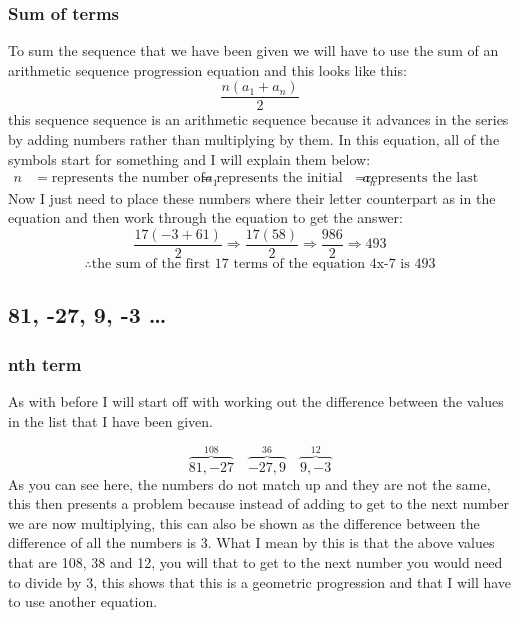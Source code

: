 \documentclass{article}
\begin{document}
\subsubsection{Sum of terms}
To sum the sequence that we have been given we will have to use the sum of an arithmetic sequence progression equation and this looks like this: 
\[
	\frac{n(a_{1} + a_{n})}{2}
\]
this sequence sequence is an arithmetic sequence because it advances in the series by adding numbers rather than multiplying by them. In this equation, all of the symbols start for something and I will explain them below:
\begin{align}

	n &= \mbox{represents the number of terms that you want to add, in this case it is 17}

	a_{1} &= \mbox{represents the initial number of the sequence, in this case it is -3}

	a_{n} &= \mbox{represents the last number of the sequence, in this case this is 61 as we calculated that before}

\end{align}
Now I just need to place these numbers where their letter counterpart as in the equation and then work through the equation to get the answer:
\[
	\frac{17( -3 + 61 )}{2} \Rightarrow \frac{17( 58 )}{2} \Rightarrow \frac{986}{2} \Rightarrow 493 
\]
\[
\therefore \mbox{the sum of the first 17 terms of the equation 4x-7 is 493}
\]
\subsection{81, -27, 9, -3 \dots}
\subsubsection{nth term}
As with before I will start off with working out the difference  between the values in the list that I have been given. 

\[
	\overbrace{81, -27}^{108}	\quad	\overbrace{-27, 9}^{36}	\quad	\overbrace{9, -3}^{12}
\]
As you can see here, the numbers do not match up and they are not the same, this then presents a problem because instead of adding to get to the next number we are now multiplying, this can also be shown as the difference between the difference of all the numbers is 3. What I mean by this is that the above values that are 108, 38 and 12, you will that to get to the next number you would need to divide by 3, this shows that this is a geometric progression and that I will have to use another equation.
\end{document}
